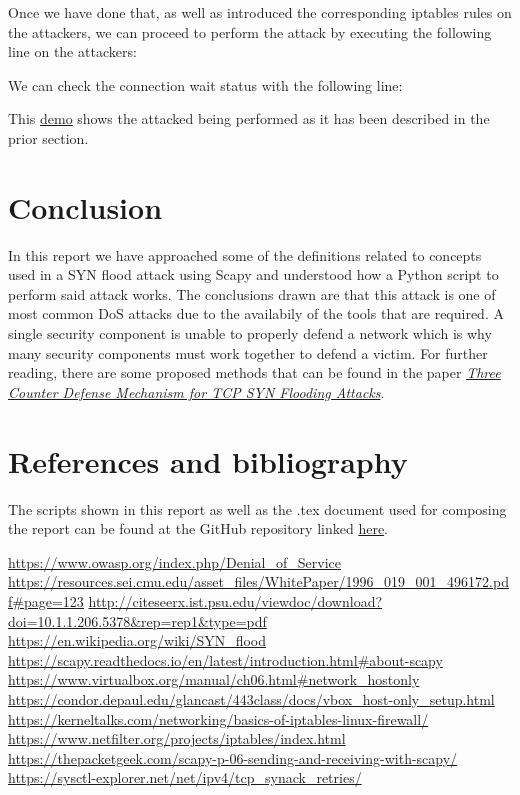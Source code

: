 \documentclass[11pt]{article}
\begin{document}
Once we have done that, as well as introduced the corresponding iptables rules on the attackers, we can proceed to perform the attack by executing the following line on the attackers:
\begin{center}
	\texttt{}
\end{center}\vspace{5mm}

We can check the connection wait status with the following line:
\begin{center}
	\texttt{}
\end{center}\vspace{5mm}

This \href{}{demo} shows the attacked being performed as it has been described in the prior section.

\section{Conclusion}
In this report we have approached some of the definitions related to concepts used in a SYN flood attack using Scapy and understood how a Python script to perform said attack works. The conclusions drawn are that this attack is one of most common DoS attacks due to the availabily of the tools that are required. A single security component is unable to properly defend a network which is why many security components must work together to defend a victim. For further reading, there are some proposed methods that can be found in the paper \emph{\href{http://citeseerx.ist.psu.edu/viewdoc/download?doi=10.1.1.206.5378&rep=rep1&type=pdf}{Three Counter Defense Mechanism for TCP SYN Flooding Attacks}}. 

\clearpage
\section{References and bibliography}

The scripts shown in this report as well as the .tex document used for composing the report can be found at the GitHub repository linked \href{https://github.com/beagaliana/syn-flooding-attack}{here}.\vspace{5mm}

\url{https://www.owasp.org/index.php/Denial\_of\_Service}\break
\url{https://resources.sei.cmu.edu/asset\_files/WhitePaper/1996\_019\_001\_496172.pdf#page=123}\break
\url{http://citeseerx.ist.psu.edu/viewdoc/download?doi=10.1.1.206.5378&rep=rep1&type=pdf}\break
\url{https://en.wikipedia.org/wiki/SYN\_flood}\break
\url{https://scapy.readthedocs.io/en/latest/introduction.html#about-scapy}\break
\url{https://www.virtualbox.org/manual/ch06.html#network\_hostonly}\break
\url{https://condor.depaul.edu/glancast/443class/docs/vbox\_host-only\_setup.html}\break
\url{https://kerneltalks.com/networking/basics-of-iptables-linux-firewall/}\break
\url{https://www.netfilter.org/projects/iptables/index.html}\break
\url{https://thepacketgeek.com/scapy-p-06-sending-and-receiving-with-scapy/}\break
\url{https://sysctl-explorer.net/net/ipv4/tcp\_synack\_retries/}\break

\printindex
\end{document}
